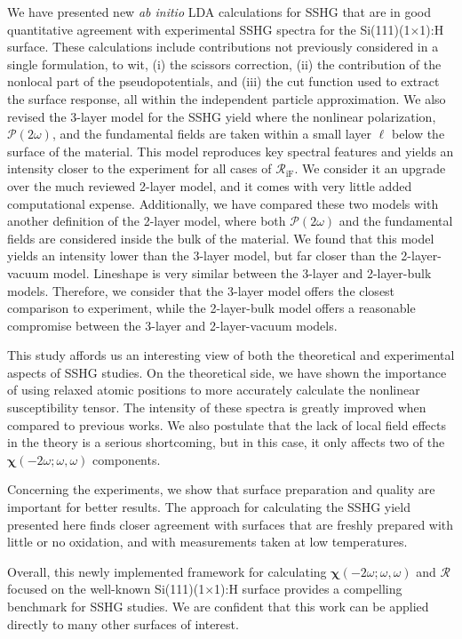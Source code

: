We have presented new \emph{ab initio} LDA calculations for SSHG that are in
good quantitative agreement with experimental SSHG spectra for the
Si(111)(1$\times$1):H surface. These calculations include contributions not
previously considered in a single formulation, to wit, (i) the scissors
correction, (ii) the contribution of the nonlocal part of the pseudopotentials,
and (iii) the cut function used to extract the surface response, all within the
independent particle approximation. We also revised the 3-layer model for the
SSHG yield where the nonlinear polarization,
$\boldsymbol{\mathcal{P}}(2\omega)$, and the fundamental fields are taken within
a small layer $\ell$ below the surface of the material. This model reproduces
key spectral features and yields an intensity closer to the experiment for all
cases of $\mathcal{R}_{\mathrm{iF}}$. We consider it an upgrade over the much
reviewed 2-layer model\cite{mizrahiJOSA88}, and it comes with very little added
computational expense. Additionally, we have compared these two models with
another definition of the 2-layer model, where both
$\boldsymbol{\mathcal{P}}(2\omega)$ and the fundamental fields are considered
inside the bulk of the material. We found that this model yields an intensity
lower than the 3-layer model, but far closer than the 2-layer-vacuum model.
Lineshape is very similar between the 3-layer and 2-layer-bulk models.
Therefore, we consider that the 3-layer model offers the closest comparison to
experiment, while the 2-layer-bulk model offers a reasonable compromise between
the 3-layer and 2-layer-vacuum models.

This study affords us an interesting view of both the theoretical and
experimental aspects of SSHG studies. On the theoretical side, we have shown the
importance of using relaxed atomic positions to more accurately calculate the
nonlinear susceptibility tensor. The intensity of these spectra is greatly
improved when compared to previous works.\cite{mejiaPRB02} We also postulate
that the lack of local field effects in the theory is a serious shortcoming, but
in this case, it only affects two of the
$\boldsymbol{\chi}(-2\omega;\omega,\omega)$ components.

Concerning the experiments, we show that surface preparation and quality are
important for better results. The approach for calculating the SSHG yield
presented here finds closer agreement with surfaces that are freshly prepared
with little or no oxidation, and with measurements taken at low temperatures.

Overall, this newly implemented framework for calculating
$\boldsymbol{\chi}(-2\omega;\omega,\omega)$ and $\mathcal{R}$ focused on the
well-known Si(111)(1$\times$1):H surface provides a compelling benchmark for
SSHG studies. We are confident that this work can be applied directly to many
other surfaces of interest.

